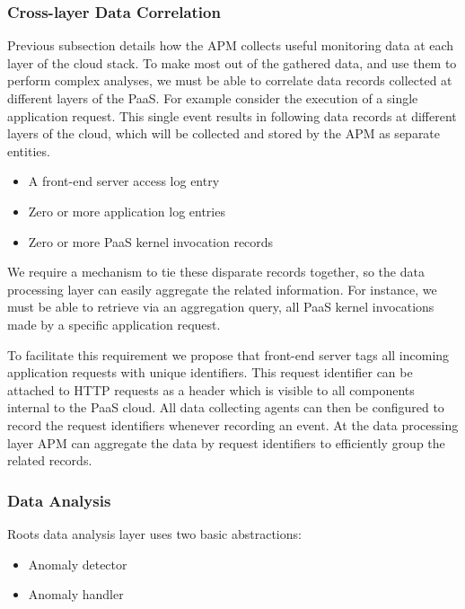\subsubsection{Cross-layer Data Correlation}
Previous subsection details how the APM collects useful monitoring data at each layer of the cloud
stack. To make most out of the gathered data, and use them to perform complex analyses, 
we must be able to correlate data records collected at different layers of the PaaS. For example consider
the execution of a single application request. This single event results in following data records at
different layers of the cloud, which will be collected and stored by the APM as separate entities.

\begin{itemize}
\item A front-end server access log entry
\item Zero or more application log entries
\item Zero or more PaaS kernel invocation records
\end{itemize}

We require a mechanism to tie these disparate records together, so the data processing layer can easily
aggregate the related information. For instance, we must be able to retrieve via an
aggregation query, all PaaS kernel invocations made by a specific application request.

To facilitate this requirement we propose that front-end server tags all incoming application requests 
with unique identifiers.
This request identifier can be attached to HTTP requests as a header which is visible to all components 
internal to the PaaS cloud. All data collecting agents can then be configured to record the request identifiers
whenever recording an event. At the data processing layer APM can aggregate the data by request identifiers
to efficiently group the related records.

\subsubsection{Data Analysis}
Roots data analysis layer uses two basic abstractions:
\begin{itemize}
\item Anomaly detector
\item Anomaly handler
\end{itemize}


